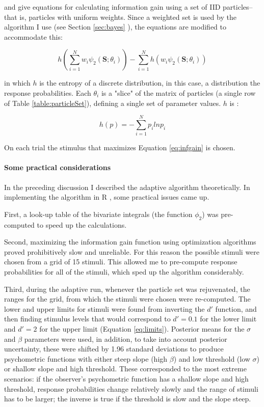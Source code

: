 \documentclass{article}\usepackage{knitr}
\begin{document}
\citet{kujalalukka2006} and \citet{kujala2011} give equations for calculating information gain using a set of IID particles--that is, particles with uniform weights. Since a weighted set is used by the algorithm I use (see Section \ref{sec:bayes} \textit{}), the equations are modified to accommodate this:

\begin{equation}
h(\sum_{i=1}^N w_i \psi_2(\bm{S};\theta_i)) - \sum_{i=1}^N h(w_i \psi_2(\bm{S};\theta_i)) 
\label{eq:infgain}
\end{equation}

in which $h$ is the entropy of a discrete distribution, in this case, a distribution the response probabilities. Each $\theta_i$ is a "slice" of the matrix of particles (a single  row of Table \ref{table:particleSet}), defining a single set of parameter values. $h$ is \citep{kontsevichtyler1999}:

\begin{equation}
h(p) = -\sum_{i = 1}^{N} p_i ln p_i
\end{equation}

On each trial the stimulus that maximizes Equation \ref{eq:infgain} is chosen.  

\paragraph{Some practical considerations}
\label{sec:practical_considerations}

In the preceding discussion I described the adaptive algorithm theoretically. In implementing the algorithm in R \citep{r_language}, some practical issues came up. 

First, a look-up table of the bivariate integrals (the function $\phi_2$) was pre-computed to speed up the calculations. 

Second, maximizing the information gain function using optimization algorithms proved prohibitively slow and unreliable. For this reason the possible stimuli were chosen from a grid of 15 stimuli. This allowed me to pre-compute response probabilities for all of the stimuli, which sped up the algorithm considerably. 

Third, during the adaptive run, whenever the particle set was rejuvenated, the ranges for the grid, from which the stimuli were chosen were re-computed. The lower and upper limits for stimuli were found from inverting the $d'$ function, and then finding stimulus levels that would correspond to $d' = 0.1$ for the lower limit and $d' = 2$ for the upper limit (Equation \ref{eq:limits}). Posterior means for the $\sigma$ and $\beta$ parameters were used, in addition, to take into account posterior uncertainty, these were shifted by 1.96 standard deviations to produce psychometric functions with either steep slope (high $\beta$) and low threshold (low $\sigma$) or shallow slope and high threshold. These corresponded to the most extreme scenarios: if the observer's psychometric function has a shallow slope and high threshold, response probabilities change relatively slowly and the range of stimuli has to be larger; the inverse is true if the threshold is slow and the slope steep. 
\end{document}
